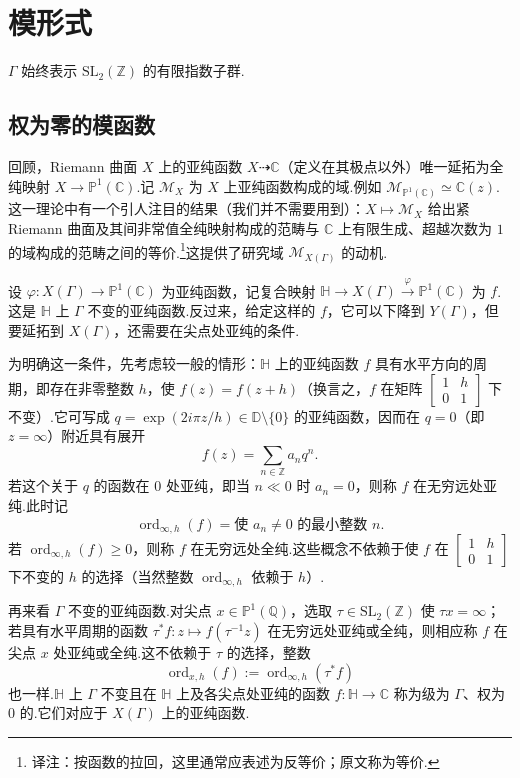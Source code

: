 \section{模形式}\label{sec:modular-1-2}
$\Gamma$ 始终表示 $\mathrm{SL}_2(\mathbb Z)$ 的有限指数子群.
\subsection{权为零的模函数}\label{sec:modular-1-2-1}
回顾，Riemann 曲面 $X$ 上的亚纯函数 $X\dashrightarrow\mathbb C$（定义在其极点以外）唯一延拓为全纯映射 $X\longrightarrow\mathbb P^1(\mathbb C)$.记 $\mathcal M_X$ 为 $X$ 上亚纯函数构成的域.例如 $\mathcal M_{\mathbb P^1(\mathbb C)}\simeq\mathbb C(z)$.这一理论中有一个引人注目的结果（我们并不需要用到）：$X\mapsto\mathcal M_X$ 给出紧 Riemann 曲面及其间非常值全纯映射构成的范畴与 $\mathbb C$ 上有限生成、超越次数为 $1$ 的域构成的范畴之间的等价.\footnote{译注：按函数的拉回，这里通常应表述为反等价；原文称为等价.}这提供了研究域 $\mathcal M_{X(\Gamma)}$ 的动机.

设 $\varphi:X(\Gamma)\longrightarrow\mathbb P^1(\mathbb C)$ 为亚纯函数，记复合映射 $\mathbb H\longrightarrow X(\Gamma)\xrightarrow{\varphi}\mathbb P^1(\mathbb C)$ 为 $f$.这是 $\mathbb H$ 上 $\Gamma$ 不变的亚纯函数.反过来，给定这样的 $f$，它可以下降到 $Y(\Gamma)$，但要延拓到 $X(\Gamma)$，还需要在尖点处亚纯的条件.

为明确这一条件，先考虑较一般的情形：$\mathbb H$ 上的亚纯函数 $f$ 具有水平方向的周期，即存在非零整数 $h$，使 $f(z)=f(z+h)$（换言之，$f$ 在矩阵 $\left[\begin{smallmatrix}1&h\\0&1\end{smallmatrix}\right]$ 下不变）.它可写成 $q=\exp(2i\pi z/h)\in\mathbb D\setminus\{0\}$ 的亚纯函数，因而在 $q=0$（即 $z=\infty$）附近具有展开
\[
f(z)=\sum_{n\in\mathbb Z}a_nq^n.
\]
若这个关于 $q$ 的函数在 $0$ 处亚纯，即当 $n\ll0$ 时 $a_n=0$，则称 $f$ 在无穷远处亚纯.此时记
\[
\operatorname{ord}_{\infty,h}(f)=\text{使 }a_n\ne0\text{ 的最小整数 }n.
\]
若 $\operatorname{ord}_{\infty,h}(f)\ge0$，则称 $f$ 在无穷远处全纯.这些概念不依赖于使 $f$ 在 $\left[\begin{smallmatrix}1&h\\0&1\end{smallmatrix}\right]$ 下不变的 $h$ 的选择（当然整数 $\operatorname{ord}_{\infty,h}$ 依赖于 $h$）.

再来看 $\Gamma$ 不变的亚纯函数.对尖点 $x\in\mathbb P^1(\mathbb Q)$，选取 $\tau\in\mathrm{SL}_2(\mathbb Z)$ 使 $\tau x=\infty$；若具有水平周期的函数 $\tau^*f:z\mapsto f(\tau^{-1}z)$ 在无穷远处亚纯或全纯，则相应称 $f$ 在尖点 $x$ 处亚纯或全纯.这不依赖于 $\tau$ 的选择，整数
\[
\operatorname{ord}_{x,h}(f):=\operatorname{ord}_{\infty,h}(\tau^*f)
\]
也一样.$\mathbb H$ 上 $\Gamma$ 不变且在 $\mathbb H$ 上及各尖点处亚纯的函数 $f:\mathbb H\longrightarrow\mathbb C$ 称为级为 $\Gamma$、权为 $0$ 的.它们对应于 $X(\Gamma)$ 上的亚纯函数.

